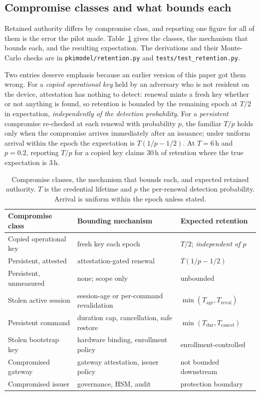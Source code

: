 \subsection{Compromise classes and what bounds each}
Retained authority differs by compromise class, and reporting one figure for all of them is the
error the pilot made. Table~\ref{tab:classes} gives the classes, the mechanism that bounds each,
and the resulting expectation. The derivations and their Monte-Carlo checks are in
\texttt{pkimodel/retention.py} and \texttt{tests/test\_retention.py}.

Two entries deserve emphasis because an earlier version of this paper got them wrong. For a
\emph{copied operational key} held by an adversary who is not resident on the device, attestation
has nothing to detect: renewal mints a fresh key whether or not anything is found, so retention is
bounded by the remaining epoch at $T/2$ in expectation, \emph{independently of the detection
probability}. For a \emph{persistent} compromise re-checked at each renewal with probability $p$,
the familiar $T/p$ holds only when the compromise arrives immediately after an issuance; under
uniform arrival within the epoch the expectation is $T(1/p - 1/2)$. At $T = 6$\,h and $p = 0.2$,
reporting $T/p$ for a copied key claims $30$\,h of retention where the true expectation is $3$\,h.

\begin{table}[t]
\centering
\caption{Compromise classes, the mechanism that bounds each, and expected retained authority.
$T$ is the credential lifetime and $p$ the per-renewal detection probability. Arrival is uniform
within the epoch unless stated.}
\label{tab:classes}
\footnotesize
\begin{tabular}{@{}p{}p{}p{}@{}}
\toprule
Compromise class & Bounding mechanism & Expected retention \\
\midrule
Copied operational key & fresh key each epoch & $T/2$; \emph{independent of $p$} \\
Persistent, attested & attestation-gated renewal & $T(1/p - 1/2)$ \\
Persistent, unmeasured & none; scope only & unbounded \\
Stolen active session & session-age or per-command revalidation & $\min(T_{\text{age}},
T_{\text{reval}})$ \\
Persistent command & duration cap, cancellation, safe restore & $\min(T_{\text{dur}},
T_{\text{cancel}})$ \\
Stolen bootstrap key & hardware binding, enrollment policy & enrollment-controlled \\
Compromised gateway & gateway attestation, issuer policy & not bounded downstream \\
Compromised issuer & governance, HSM, audit & protection boundary \\
\bottomrule
\end{tabular}
\end{table}

